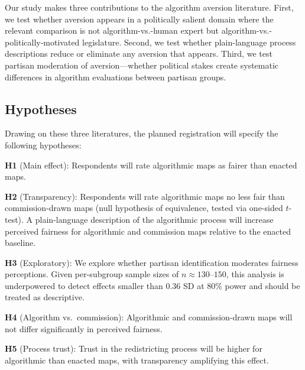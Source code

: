 Our study makes three contributions to the algorithm aversion literature. First, we test whether aversion appears in a politically salient domain where the relevant comparison is not algorithm-vs.-human expert but algorithm-vs.-politically-motivated legislature. Second, we test whether plain-language process descriptions reduce or eliminate any aversion that appears. Third, we test partisan moderation of aversion---whether political stakes create systematic differences in algorithm evaluations between partisan groups.

\subsection{Hypotheses}

Drawing on these three literatures, the planned registration will specify the
following hypotheses:

\textbf{H1} (Main effect): Respondents will rate algorithmic maps as fairer than enacted maps.

\textbf{H2} (Transparency): Respondents will rate algorithmic maps no less fair than commission-drawn maps (null hypothesis of equivalence, tested via one-sided $t$-test). A plain-language description of the algorithmic process will increase perceived fairness for algorithmic and commission maps relative to the enacted baseline.

\textbf{H3} (Exploratory): We explore whether partisan identification moderates fairness perceptions. Given per-subgroup sample sizes of $n \approx 130$--$150$, this analysis is underpowered to detect effects smaller than $0.36$ SD at 80\% power and should be treated as descriptive.

\textbf{H4} (Algorithm vs.\ commission): Algorithmic and commission-drawn maps will not differ significantly in perceived fairness.

\textbf{H5} (Process trust): Trust in the redistricting process will be higher for algorithmic than enacted maps, with transparency amplifying this effect.
